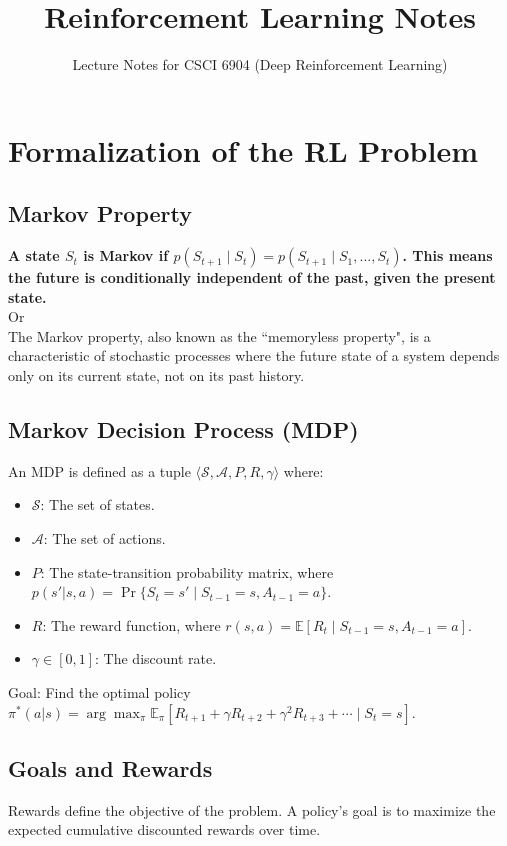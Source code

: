 \documentclass[12pt]{article}
\title{Reinforcement Learning Notes}
\author{Lecture Notes for CSCI 6904 (Deep Reinforcement Learning)}
\begin{document}
\maketitle

\tableofcontents

\newpage

\section{Formalization of the RL Problem }


\subsection{Markov Property}
\textbf{A state $S_t$ is Markov if $p(S_{t+1} \mid S_t) = p(S_{t+1} \mid S_1, \dots, S_t)$. This means the future is conditionally independent of the past, given the present state.} \\
Or \\
The Markov property, also known as the ``memoryless property", is a characteristic of stochastic processes where the future state of a system depends only on its current state, not on its past history.

\subsection{Markov Decision Process (MDP)}
An MDP is defined as a tuple $\langle \mathcal{S}, \mathcal{A}, P, R, \gamma \rangle$ where:
\begin{itemize}
    \item $\mathcal{S}$: The set of states.
    \item $\mathcal{A}$: The set of actions.
    \item $P$: The state-transition probability matrix, where $p(s'|s,a) = \Pr\{S_t = s' \mid S_{t-1} = s, A_{t-1} = a\}$.
    \item $R$: The reward function, where $r(s,a) = \mathbb{E}[R_t \mid S_{t-1} = s, A_{t-1} = a]$.
    \item $\gamma \in [0,1]$: The discount rate.
\end{itemize}
Goal: Find the optimal policy $\pi^*(a|s) = \arg\max_\pi \mathbb{E}_\pi [R_{t+1} + \gamma R_{t+2} + \gamma^2 R_{t+3} + \cdots \mid S_t = s]$.


\subsection{Goals and Rewards}
Rewards define the objective of the problem. A policy's goal is to maximize the expected cumulative discounted rewards over time.
\end{document}
